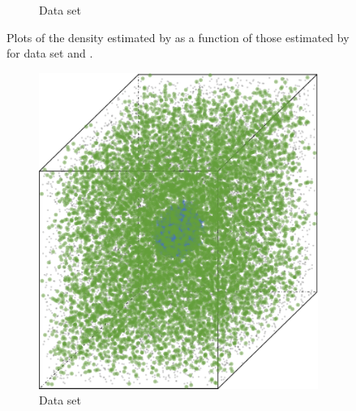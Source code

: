 \begin{figure}
\begin{subfigure}{0.3\textwidth}
				\caption{Data set \baakmanThree}
				\label{fig:discussion:performance:mbevssambe:baakman3}
			\end{subfigure}
			\caption{Plots of the density estimated by \sambe as a function of those estimated by \mbe for data set %
				\ferdosiThree and %
				\baakmanThree.
			}
			\label{fig:discussion:performance:four:mbevssambe}
		\end{figure}

		\begin{figure}
			\centering
			\begin{subfigure}{0.23\textwidth}
				\centering
				\includegraphics[keepaspectratio=true, width=\textwidth, height=0.23\textheight]{discussion/img/ferdosi_1_abs_error_mbeSmallerThansambe}
				\caption{Data set \ferdosiOne}
				\label{fig:discussion:performance:mbeLowerError:ferdosi1}
			\end{subfigure}
			\begin{subfigure}{0.23\textwidth}
				\centering

\end{subfigure}
\end{figure}
